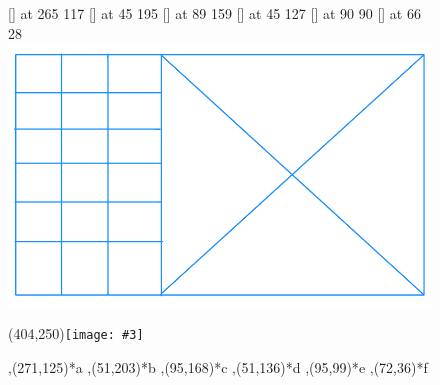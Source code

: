 \documentclass{article}
\newenvironment{xyoverpic}[3]
{%
\begin{xy}
\xyimport#1{\texttt{[image: \#3]}}
}{\end{xy}}
\newenvironment{cxyoverpic}[3]
{%
\centering \leavevmode
\begin{xyoverpic}{#1}{#2}{#3}
}{\end{xyoverpic}}
\begin{document}
\begin{figure}[htb]
\small\hair 2pt
  [] at 265 117
  [] at 45 195
  [] at 89 159
  [] at 45 127
  [] at 90 90
  [] at 66 28
\endlabellist
\centering
\includegraphics[scale=1.0]{test-image}
\caption{  }
\label{fig:label}
\end{figure}

\begin{figure}[htb]
\begin{cxyoverpic}{(404,250)}{scale=1.0}{test-image}
    ,(271,125)*{a}
    ,(51,203)*{b}
    ,(95,168)*{c}
    ,(51,136)*{d}
    ,(95,99)*{e}
    ,(72,36)*{f}
\end{cxyoverpic}
  \caption{}
  \label{fig-}
\end{figure}
\end{document}
